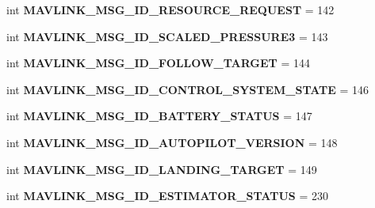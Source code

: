 \begin{DoxyCompactItemize}
int {\bfseries M\+A\+V\+L\+I\+N\+K\+\_\+\+M\+S\+G\+\_\+\+I\+D\+\_\+\+R\+E\+S\+O\+U\+R\+C\+E\+\_\+\+R\+E\+Q\+U\+E\+ST} = 142
\item 
\mbox{\label{namespacepymavlink_1_1dialects_1_1v10_a431a0a77777013504cd98a99c10352e5}} 
int {\bfseries M\+A\+V\+L\+I\+N\+K\+\_\+\+M\+S\+G\+\_\+\+I\+D\+\_\+\+S\+C\+A\+L\+E\+D\+\_\+\+P\+R\+E\+S\+S\+U\+R\+E3} = 143
\item 
\mbox{\label{namespacepymavlink_1_1dialects_1_1v10_a46e635de141f340e68515fbb9c3e0889}} 
int {\bfseries M\+A\+V\+L\+I\+N\+K\+\_\+\+M\+S\+G\+\_\+\+I\+D\+\_\+\+F\+O\+L\+L\+O\+W\+\_\+\+T\+A\+R\+G\+ET} = 144
\item 
\mbox{\label{namespacepymavlink_1_1dialects_1_1v10_a3e73ed1ef92cde4f08287eaee2e5d9b5}} 
int {\bfseries M\+A\+V\+L\+I\+N\+K\+\_\+\+M\+S\+G\+\_\+\+I\+D\+\_\+\+C\+O\+N\+T\+R\+O\+L\+\_\+\+S\+Y\+S\+T\+E\+M\+\_\+\+S\+T\+A\+TE} = 146
\item 
\mbox{\label{namespacepymavlink_1_1dialects_1_1v10_ad3907c768ae7e350bd11355df7548a5f}} 
int {\bfseries M\+A\+V\+L\+I\+N\+K\+\_\+\+M\+S\+G\+\_\+\+I\+D\+\_\+\+B\+A\+T\+T\+E\+R\+Y\+\_\+\+S\+T\+A\+T\+US} = 147
\item 
\mbox{\label{namespacepymavlink_1_1dialects_1_1v10_a56be44b8267766087f9be1ca04fe5c95}} 
int {\bfseries M\+A\+V\+L\+I\+N\+K\+\_\+\+M\+S\+G\+\_\+\+I\+D\+\_\+\+A\+U\+T\+O\+P\+I\+L\+O\+T\+\_\+\+V\+E\+R\+S\+I\+ON} = 148
\item 
\mbox{\label{namespacepymavlink_1_1dialects_1_1v10_a9c227f6ed3ab37eefd14e4f715c263a3}} 
int {\bfseries M\+A\+V\+L\+I\+N\+K\+\_\+\+M\+S\+G\+\_\+\+I\+D\+\_\+\+L\+A\+N\+D\+I\+N\+G\+\_\+\+T\+A\+R\+G\+ET} = 149
\item 
\mbox{\label{namespacepymavlink_1_1dialects_1_1v10_aec65c0712c167af6e9f6b941344452c4}} 
int {\bfseries M\+A\+V\+L\+I\+N\+K\+\_\+\+M\+S\+G\+\_\+\+I\+D\+\_\+\+E\+S\+T\+I\+M\+A\+T\+O\+R\+\_\+\+S\+T\+A\+T\+US} = 230
\item 
\mbox{\label{namespacepymavlink_1_1dialects_1_1v10_a6477589d50c4152f92770c82b830d436}} 

\end{DoxyCompactItemize}

